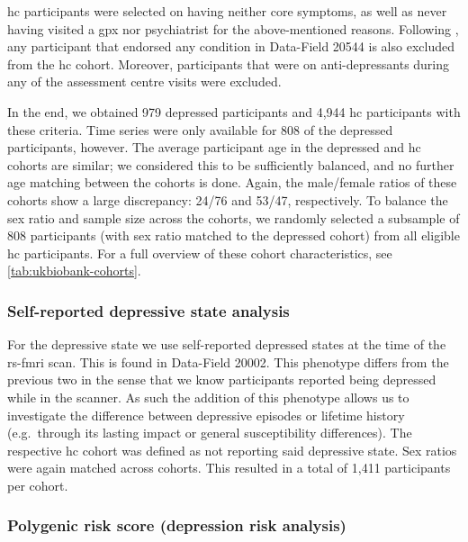 \gls{hc} participants were selected on having neither core symptoms, as well as never having visited a \gls{gpx} nor psychiatrist for the above-mentioned reasons.
Following \textcite{Glanville2021}, any participant that endorsed any condition in Data-Field 20544 is also excluded from the \gls{hc} cohort.
Moreover, participants that were on anti-depressants during any of the assessment centre visits were excluded.

In the end, we obtained 979 depressed participants and 4,944 \gls{hc} participants with these criteria.
Time series were only available for 808 of the depressed participants, however.
The average participant age in the depressed and \gls{hc} cohorts are similar; we considered this to be sufficiently balanced, and no further age matching between the cohorts is done.
Again, the male/female ratios of these cohorts show a large discrepancy: 24/76 and 53/47, respectively.
To balance the sex ratio and sample size across the cohorts, we randomly selected a subsample of 808 participants (with sex ratio matched to the depressed cohort) from all eligible \gls{hc} participants.
For a full overview of these cohort characteristics, see \cref{tab:ukbiobank-cohorts}.

\subsubsection{Self-reported depressive state analysis}

For the depressive state we use self-reported depressed states at the time of the \gls{rs-fmri} scan.
This is found in Data-Field 20002.
This phenotype differs from the previous two in the sense that we know participants reported being depressed while in the scanner.
As such the addition of this phenotype allows us to investigate the difference between depressive episodes or lifetime history (e.g.~through its lasting impact or general susceptibility differences).
The respective \gls{hc} cohort was defined as not reporting said depressive state.
%
Sex ratios were again matched across cohorts.
This resulted in a total of 1,411 participants per cohort.

\subsubsection{Polygenic risk score (depression risk analysis)}

